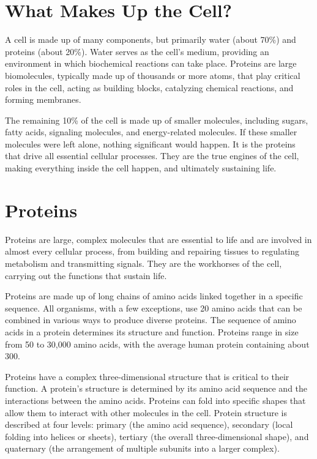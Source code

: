 \section{What Makes Up the Cell?}

A cell is made up of many components, but primarily water (about 70\%) and proteins (about 20\%). Water serves as the cell's medium, providing an environment in which biochemical reactions can take place. Proteins are large biomolecules, typically made up of thousands or more atoms, that play critical roles in the cell, acting as building blocks, catalyzing chemical reactions, and forming membranes.

The remaining 10\% of the cell is made up of smaller molecules, including sugars, fatty acids, signaling molecules, and energy-related molecules. If these smaller molecules were left alone, nothing significant would happen. It is the proteins that drive all essential cellular processes. They are the true engines of the cell, making everything inside the cell happen, and ultimately sustaining life.

\section{Proteins}

Proteins are large, complex molecules that are essential to life and are involved in almost every cellular process, from building and repairing tissues to regulating metabolism and transmitting signals. They are the workhorses of the cell, carrying out the functions that sustain life.

Proteins are made up of long chains of amino acids linked together in a specific sequence. All organisms, with a few exceptions, use 20 amino acids that can be combined in various ways to produce diverse proteins. The sequence of amino acids in a protein determines its structure and function. Proteins range in size from 50 to 30,000 amino acids, with the average human protein containing about 300.

Proteins have a complex three-dimensional structure 
that is critical to their function. A protein's structure is determined by its amino acid sequence and the interactions between the amino acids.
Proteins can fold into specific shapes that allow them to interact with other molecules in the cell. Protein structure is described at four levels: primary (the amino acid sequence), secondary (local folding into helices or sheets), tertiary (the overall three-dimensional shape), and quaternary (the arrangement of multiple subunits into a larger complex).

